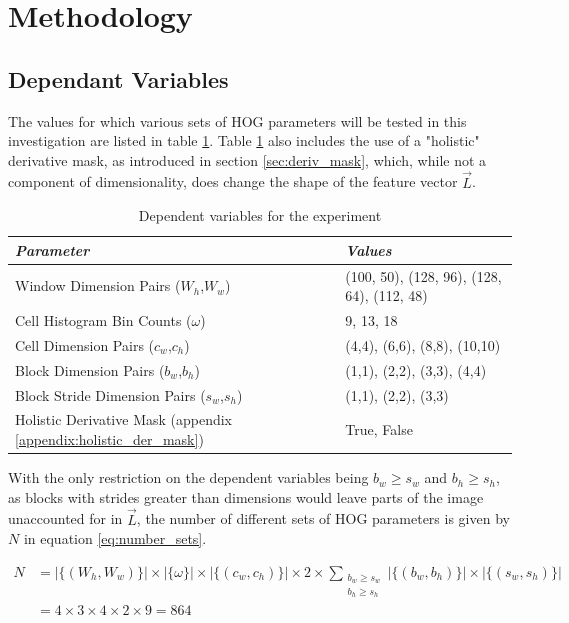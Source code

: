 \section{Methodology}

\subsection{Dependant Variables}\label{sec:dependent_variables}


The values for which various sets of HOG parameters will be tested in this investigation are listed in table \ref{table:dependent_variables}. Table \ref{table:dependent_variables} also includes the use of a "holistic" derivative mask, as introduced in section \ref{sec:deriv_mask}, which, while not a component of dimensionality, does change the shape of the feature vector $\vec{L}$.

\begin{table}
\renewcommand{\arraystretch}{1.0}
\begin{tabular}{@{} l @{\hspace{1cm}} l @{}}    
    \toprule
    \emph{Parameter} & \emph{Values}  \\\midrule
    Window Dimension Pairs ($W_h$,$W_w$)             & (100, 50), (128, 96), (128, 64), (112, 48)  \\ 
    Cell Histogram Bin Counts ($\omega$)              & 9, 13, 18  \\ 
    Cell Dimension Pairs ($c_w$,$c_h$)           & (4,4), (6,6), (8,8), (10,10)  \\ 
    Block Dimension Pairs ($b_w$,$b_h$)           & (1,1), (2,2), (3,3), (4,4)  \\ 
    Block Stride Dimension Pairs ($s_w$,$s_h$)              & (1,1), (2,2), (3,3)  \\ 
    Holistic Derivative Mask (appendix \ref{appendix:holistic_der_mask}) & True, False  \\\bottomrule
\end{tabular}
\caption{Dependent variables for the experiment}
\label{table:dependent_variables}
\end{table}

With the only restriction on the dependent variables being $b_w\ge s_w$ and $b_h\ge s_h$, as blocks with strides greater than dimensions would leave parts of the image unaccounted for in $\vec{L}$, the number of different sets of HOG parameters is given by $N$ in equation \ref{eq:number_sets}.

\begin{equation}\label{eq:number_sets}
\begin{split}
N &= |\{(W_h, W_w)\}| \times |\{\omega\}| \times |\{(c_w, c_h)\}| \times 2 \times \sum_{\substack{b_w \geq s_w \\ b_h \geq s_h}} |\{(b_w, b_h)\}| \times |\{(s_w, s_h)\}|  \\
&= 4 \times 3 \times 4 \times 2 \times 9  =864
\end{split}
\end{equation}

